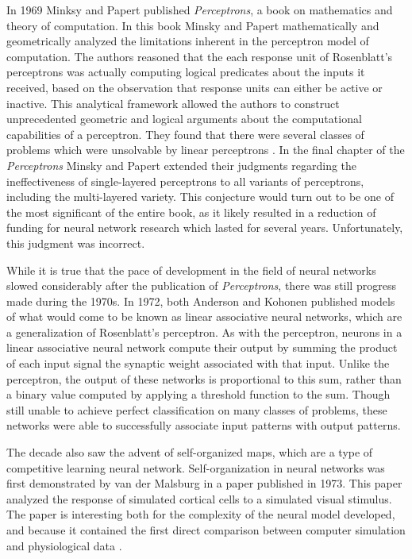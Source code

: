 \documentclass[11pt]{afthesis}
\begin{document}
	
	In 1969 Minksy and Papert published \textit{Perceptrons}, a book on mathematics and theory of computation. In this book Minsky and Papert mathematically and geometrically analyzed the limitations inherent in the perceptron model of computation. The authors reasoned that the each response unit of Rosenblatt's perceptrons was actually computing logical predicates about the inputs it received, based on the observation that response units can either be active or inactive. This analytical framework allowed the authors to construct unprecedented geometric and logical arguments about the computational capabilities of a perceptron. They found that there were several classes of problems which were unsolvable by linear perceptrons \cite{minsky1969perceptrons}. In the final chapter of the \textit{Perceptrons} Minsky and Papert extended their judgments regarding the ineffectiveness of single-layered perceptrons to all variants of perceptrons, including the multi-layered variety. This conjecture would turn out to be one of the most significant of the entire book, as it likely resulted in a reduction of funding for neural network research \cite{anderson1988neurocomputing} which lasted for several years. Unfortunately, this judgment was incorrect.
	
	While it is true that the pace of development in the field of neural networks slowed considerably after the publication of \textit{Perceptrons}, there was still progress made during the 1970s. In 1972, both Anderson \cite{anderson1972interactive} and Kohonen \cite{kohonen1972correlation} published models of what would come to be known as linear associative neural networks, which are a generalization of Rosenblatt's perceptron. As with the perceptron, neurons in a linear associative neural network compute their output by summing the product of each input signal the synaptic weight associated with that input. Unlike the perceptron, the output of these networks is proportional to this sum, rather than a binary value computed by applying a threshold function to the sum. Though still unable to achieve perfect classification on many classes of problems, these networks were able to successfully associate input patterns with output patterns. 
	
	
	The decade also saw the advent of self-organized maps, which are a type of competitive learning neural network. Self-organization in neural networks was first demonstrated by van der Malsburg in a paper \cite{vonderMalsburg1973selforganization} published in 1973. This paper analyzed the response of simulated cortical cells to a simulated visual stimulus. The paper is interesting both for the complexity of the neural model developed, and because it contained the first direct comparison between computer simulation and physiological data \cite{anderson1988neurocomputing}. 
	
\end{document}
